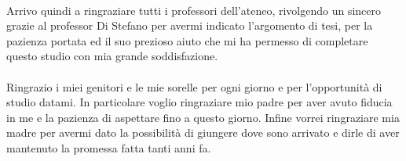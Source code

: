 \documentclass[a4paper,12pt]{tesiinfo}
\begin{document}
\\
Arrivo quindi a ringraziare tutti i professori dell'ateneo, rivolgendo un sincero grazie al professor Di Stefano per avermi indicato l'argomento di tesi, per la pazienza portata ed il suo prezioso aiuto che mi ha permesso di completare questo studio con mia grande soddisfazione.
\\
\\
Ringrazio i miei genitori e le mie sorelle per ogni giorno e per l'opportunit\`a di studio datami. In particolare voglio ringraziare mio padre per aver avuto fiducia in me e la pazienza di aspettare fino a questo giorno. Infine vorrei ringraziare mia madre per avermi dato la possibilit\`a di giungere dove sono arrivato e dirle di aver mantenuto la promessa fatta tanti anni fa.
\end{document}
